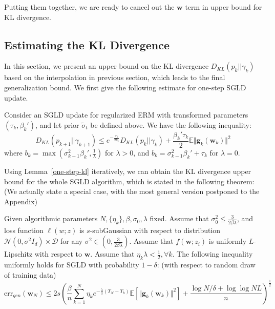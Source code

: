 \documentclass[final,12pt]{colt2018} %
\newcommand{\w}{\bm{w}}
\begin{document}
 Putting them together, we are ready to cancel out the $\bm{w}$ term in upper bound for KL divergence.


\subsection{Estimating the KL Divergence}
In this section, we present an upper bound on the KL divergence $D_{KL}(p_k|| \gamma_k)$ based on the interpolation in previous section, which leads to the final generalization bound. We first give the following estimate for one-step SGLD update.
\begin{lemma}\label{one-step-kl}
  Consider an SGLD update for regularized ERM with transformed parameters $(\tau_k,\beta_k')$, and let prior $\tilde{\sigma}_t$ be defined above. We have the following inequality:
  \begin{equation}
    D_{KL}\left(p_{k+1}\Big|\Big|\gamma_{k+1}\right)\leq e^{-\frac{\tau_k}{2b_k}}D_{KL}\left(p_{k}\big|\big|\gamma_{k}\right)+\frac{\beta_k'\tau_k}{2}\mathbb{E} \Vert \bm{g}_k(\bm{w}_k)\Vert^2
  \end{equation}
  where $b_k=\max\left(\sigma_{k-1}^2\beta_k', \frac{1}{\lambda}\right)$ for $\lambda>0$, and $b_k=\sigma_{k-1}^2\beta_k'+\tau_k$ for $\lambda=0$.
\end{lemma}


Using Lemma~\ref{one-step-kl} iteratively, we can obtain the KL divergence upper bound for the whole SGLD algorithm, which is stated in the following theorem: (We actually state a special case, with the most general version postponed to the Appendix)
\begin{theorem}\label{pac-bayes-final}
  Given algorithmic parameters $N,\{\eta_k\},\beta,\sigma_0,\lambda$ fixed.
  Assume that $\sigma_0^2\leq \frac{3}{2\beta\lambda}$, and loss function $\ell(w;z)$ is $s$-subGaussian with respect to distribution $\mathcal{N}(0,\sigma^2I_d)\times \mathcal{D}$ for any $\sigma^2\in\left(0,\frac{3}{2\beta\lambda}\right)$. Assume that $f(\w;z_i)$ is uniformly $L$-Lipschitz with respect to $\w$. Assume that $\eta_k\lambda< \frac{1}{2},\forall k$. The following inequality uniformly holds for SGLD with probability $1-\delta$: (with respect to random draw of training data)
  \begin{equation}
      \mathrm{err}_{gen}(\bm{w}_{N})\leq 2s\left(\frac{\beta}{n}\sum_{k=1}^{N} \eta_k e^{-\frac{\lambda}{3}(T_N-T_k)}\mathbb{E}\left[\Vert\bm{g}_k(\bm{w}_k)\Vert^2\right]+\frac{\log N/\delta+\log\log NL}{n}\right)^{\frac{1}{2}}
  \end{equation}
\end{theorem}
\end{document}
